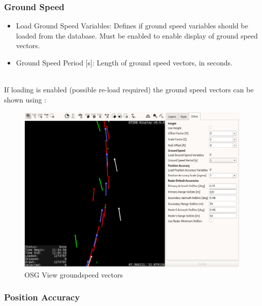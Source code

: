 \subsubsection{Ground Speed}
\label{sec:others_ground_speed}

\begin{itemize}
 \item Load Ground Speed Variables: Defines if ground speed variables should be loaded from the database. Must be enabled to enable display of ground speed vectors.
 \item Ground Speed Period [s]: Length of ground speed vectors, in seconds.
\end{itemize}
\ \\

If loading is enabled (possible re-load required) the ground speed vectors can be shown using :

\begin{figure}[H]
    \hspace*{-2.5cm}
    \includegraphics[width=19cm,frame]{figures/osgview_groundspeed_vectors.png}
  \caption{OSG View groundspeed vectors}
\end{figure} 

\subsubsection{Position Accuracy}
\label{sec:others_position_accuracy}

